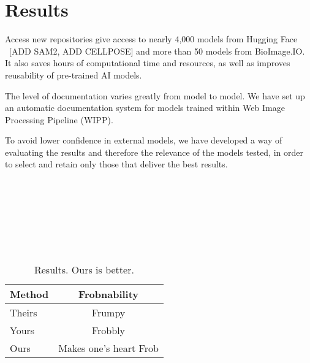 \section{Results}
\label{sec:results}

Access new repositories give access to nearly 4,000 models from Hugging Face
\TODO\ [ADD SAM2, ADD CELLPOSE] and more than 50 models from BioImage.IO. It
also saves hours of computational time and resources, as well as improves
reusability of pre-trained AI models.

The level of documentation varies greatly from model to model. We have set up an
automatic documentation system for models trained within Web Image Processing
Pipeline (WIPP).

To avoid lower confidence in external models, we have developed a way of
evaluating the results and therefore the relevance of the models tested, in
order to select and retain only those that deliver the best results.

\TODO\

\TODO\

\TODO\

\TODO\

\begin{table}[H]
\centering
\caption{\label{tab:example}%
  Results.
  Ours is better.
}
\begin{tabular}{lc}
  \toprule
  Method & Frobnability \\
  \midrule
  Theirs & Frumpy \\
  Yours & Frobbly \\
  Ours & Makes one's heart Frob\\
  \bottomrule
\end{tabular}
\end{table}



